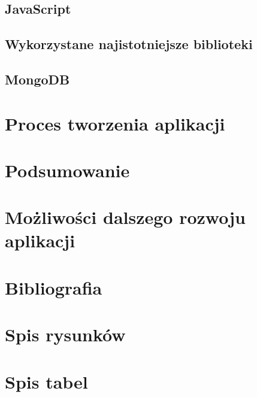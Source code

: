 \documentclass[12pt]{article}
\begin{document}
\begin{sloppypar}
{{}
\subsection{JavaScript}
{

}
\subsection{Wykorzystane najistotniejsze biblioteki}
{

}
\subsection{MongoDB}
{

}
}

\section{Proces tworzenia aplikacji}
{

}

\section{Podsumowanie}
{

}

\section{Możliwości dalszego rozwoju aplikacji}
{

}

\section{Bibliografia}
{
  \printbibliography
}

\section{Spis rysunków}
{
  \listoffigures
}

\section{Spis tabel}
{
  \listoftables
}

\end{sloppypar}
\end{document}
